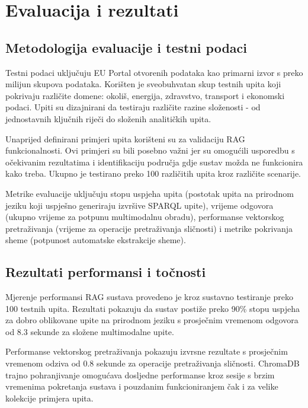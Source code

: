 \chapter{Evaluacija i rezultati}
\label{ch:evaluation}


\section{Metodologija evaluacije i testni podaci}

Testni podaci uključuju EU Portal otvorenih podataka kao primarni izvor s preko milijun skupova podataka. Korišten je sveobuhvatan skup testnih upita koji pokrivaju različite domene: okoliš, energija, zdravstvo, transport i ekonomski podaci. Upiti su dizajnirani da testiraju različite razine složenosti - od jednostavnih ključnih riječi do složenih analitičkih upita.

Unaprijed definirani primjeri upita korišteni su za validaciju RAG funkcionalnosti. Ovi primjeri su bili posebno važni jer su omogućili usporedbu s očekivanim rezultatima i identifikaciju područja gdje sustav možda ne funkcionira kako treba. Ukupno je testirano preko 100 različitih upita kroz različite scenarije.

Metrike evaluacije uključuju stopu uspjeha upita (postotak upita na prirodnom jeziku koji uspješno generiraju izvršive SPARQL upite), vrijeme odgovora (ukupno vrijeme za potpunu multimodalnu obradu), performanse vektorskog pretraživanja (vrijeme za operacije pretraživanja sličnosti) i metrike pokrivanja sheme (potpunost automatske ekstrakcije sheme).

\section{Rezultati performansi i točnosti}

Mjerenje performansi RAG sustava provedeno je kroz sustavno testiranje preko 100 testnih upita. Rezultati pokazuju da sustav postiže preko 90\% stopu uspjeha za dobro oblikovane upite na prirodnom jeziku s prosječnim vremenom odgovora od 8.3 sekunde za složene multimodalne upite.

Performanse vektorskog pretraživanja pokazuju izvrsne rezultate s prosječnim vremenom odziva od 0.8 sekunde za operacije pretraživanja sličnosti. ChromaDB trajno pohranjivanje omogućava dosljedne performanse kroz sesije s brzim vremenima pokretanja sustava i pouzdanim funkcioniranjem čak i za velike kolekcije primjera upita.

